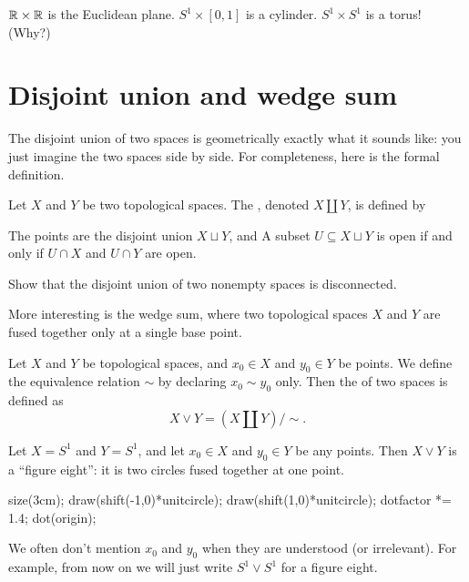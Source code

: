 \begin{example}
	\listhack
	\begin{enumerate}[(a)]
		\ii $\mathbb R \times \mathbb R$ is the Euclidean plane.
		\ii $S^1 \times [0,1]$ is a cylinder.
		\ii $S^1 \times S^1$ is a torus! (Why?)
	\end{enumerate}
\end{example}

\section{Disjoint union and wedge sum}

The disjoint union of two spaces is geometrically exactly
what it sounds like: you just imagine the two spaces side by side.
For completeness, here is the formal definition.
\begin{definition}
	Let $X$ and $Y$ be two topological spaces.
	The , denoted $X \amalg Y$, is defined by
	\begin{itemize}
		\ii The points are the disjoint union $X \sqcup Y$, and
		\ii A subset $U \subseteq X \sqcup Y$ is open if
		and only if $U \cap X$ and $U \cap Y$ are open.
	\end{itemize}
\end{definition}
\begin{exercise}
	Show that the disjoint union of two nonempty spaces is disconnected.
\end{exercise}

More interesting is the wedge sum, where two topological spaces $X$
and $Y$ are fused together only at a single base point.
\begin{definition}
	Let $X$ and $Y$ be topological spaces, and $x_0 \in X$ and $y_0 \in Y$
	be points.
	We define the equivalence relation $\sim$ by declaring $x_0 \sim y_0$ only.
	Then the  of two spaces is defined as
	\[ X \vee Y = (X \amalg Y) / {\sim}. \]
\end{definition}

\begin{example}
	Let $X = S^1$ and $Y = S^1$,
	and let $x_0 \in X$ and $y_0 \in Y$ be any points.
	Then $X \vee Y$ is a ``figure eight'': it is two
	circles fused together at one point.
	\begin{center}
		\begin{asy}
			size(3cm);
			draw(shift(-1,0)*unitcircle);
			draw(shift(1,0)*unitcircle);
			dotfactor *= 1.4;
			dot(origin);
		\end{asy}
	\end{center}
\end{example}
\begin{abuse}
	We often don't mention $x_0$ and $y_0$ when they are understood
	(or irrelevant).  For example, from now on we will just
	write $S^1 \vee S^1$ for a figure eight.
\end{abuse}

